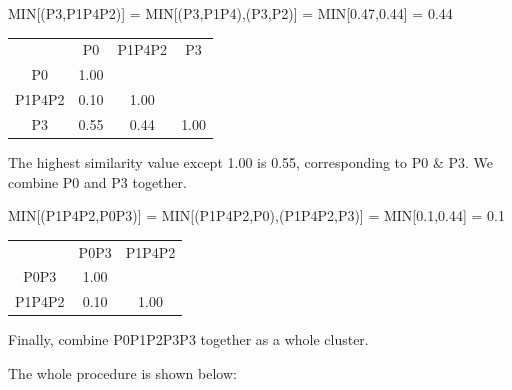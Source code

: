 \documentclass{article}
\begin{document}
MIN[(P3,P1P4P2)] = MIN[(P3,P1P4),(P3,P2)] = MIN[0.47,0.44] = 0.44

\begin{center}
\begin{tabular}{ c c c c}

 & P0 & P1P4P2 & P3 \\

P0 & 1.00 &  &  \\

P1P4P2 & 0.10 & 1.00 &  \\
 
P3 & 0.55 & 0.44 & 1.00 \\

\end{tabular}
\end{center}

The highest similarity value except 1.00 is 0.55, corresponding to P0 \& P3. We combine P0 and P3 together.

MIN[(P1P4P2,P0P3)] = MIN[(P1P4P2,P0),(P1P4P2,P3)] = MIN[0.1,0.44] = 0.1

\begin{center}
\begin{tabular}{ c c c}

 & P0P3 & P1P4P2 \\

P0P3 & 1.00 & \\

P1P4P2 & 0.10 & 1.00\\

\end{tabular}
\end{center}

Finally, combine P0P1P2P3P3 together as a whole cluster.

The whole procedure is shown below:
\end{document}
